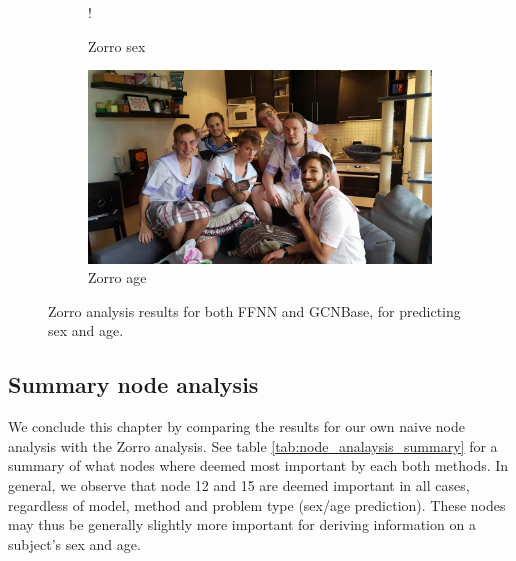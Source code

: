 \begin{figure}[H]
    \centering
        \begin{subfigure}{.5\textwidth}
            \centering
            \begin{center}
                 {!} {
                    
                }
            \end{center}
            \caption{Zorro sex}
            \label{fig:zorro_results_sex}
        \end{subfigure}%
        \begin{subfigure}{.5\textwidth}
            \centering
            \includegraphics[width=.9\linewidth]{chapters/images_theory/placeholder.jpg}
            \caption{Zorro age}
            \label{fig:zorro_results_age}
        \end{subfigure}
    \caption{Zorro analysis results for both FFNN and GCNBase, for predicting sex and age.}
    \label{fig:zorro_results}
\end{figure}

\subsection{Summary node analysis}

We conclude this chapter by comparing the results for our own naive node analysis with the Zorro analysis. See table \ref{tab:node_analaysis_summary} for a summary of what nodes where deemed most important by each both methods. In general, we observe that node 12 and 15 are deemed important in all cases, regardless of model, method and problem type (sex/age prediction). These nodes may thus be generally slightly more important for deriving information on a subject's sex and age. 

